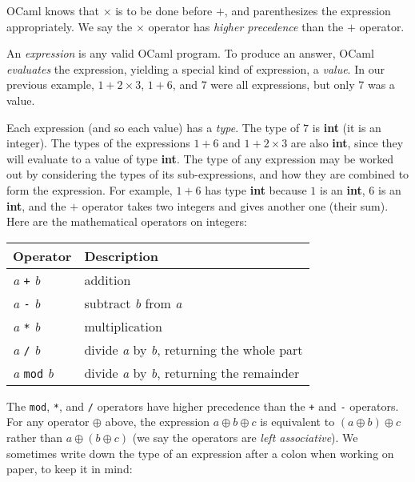 \documentclass[]{book}
\newcommand{\smspace}{\vspace{4mm}}
\begin{document}
\noindent OCaml knows that $\times$ is to be done before $+$, and parenthesizes the expression appropriately. We say the $\times$ operator has \textit{higher precedence} than the $+$ operator.

An \textit{expression} is any valid OCaml program. To produce an answer, OCaml
\textit{evaluates} the expression, yielding a special kind of expression, a
\textit{value}. In our previous example, $1 + 2 \times 3$, $1 + 6$, and $7$ were all
expressions, but only $7$ was a value.

Each expression (and so each value) has a \textit{type}. The type of $7$ is
\textsf{\textbf{int}} (it is an integer). The types of the expressions $1 + 6$ and $1 + 2 \times 3$ are also
\textsf{\textbf{int}}, since they will evaluate to a value of type \textsf{\textbf{int}}. The type of any expression may be worked out by considering the types of its
 sub-expressions, and how they are combined to form the expression. For example, $1 + 6$ has
type \textsf{\textbf{int}} because $1$ is an \textsf{\textbf{int}}, $6$ is an \textsf{\textbf{int}}, and
the $+$ operator takes two integers and gives another one (their sum). Here are the mathematical operators on integers:

\smspace
\noindent\begin{tabular}{@{}ll@{}} \toprule
Operator & Description\\
\midrule
\index{+@\texttt{+}}\textit{a} \texttt{+} \textit{b} & addition\\
\index{-@\texttt{-}}\textit{a} \texttt{-} \textit{b} & subtract \textit{b} from \textit{a}\\
\index{*@\texttt{*}}\textit{a} \texttt{*} \textit{b} & multiplication\\
\index{/@\texttt{/}}\textit{a} \texttt{/} \textit{b} & divide \textit{a} by \textit{b}, returning the whole part\\
\index{mod@\texttt{mod}}\textit{a} \texttt{mod} \textit{b} & divide \textit{a} by \textit{b}, returning the remainder\\ \bottomrule
\end{tabular}
\smspace

\noindent The \texttt{mod}, \texttt{*}, and \texttt{/} operators have higher precedence than the \texttt{+} and \texttt{-} operators. For any operator $\oplus$ above, the expression $a \oplus b\oplus c$ is equivalent to $(a \oplus b)\oplus c$ rather than $a \oplus (b \oplus c)$  (we say the operators are \textit{left associative}). We sometimes write down the type of an expression after a colon when working on paper, to keep it in mind:
\end{document}
